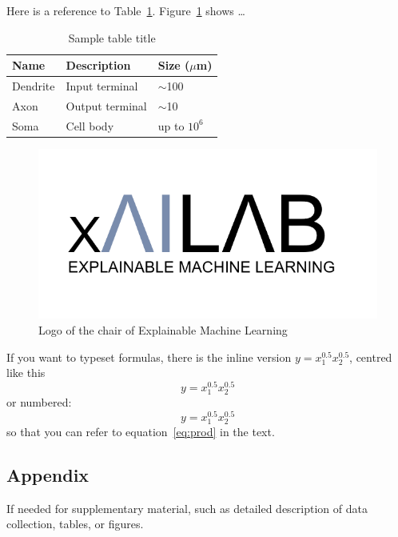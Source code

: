 \documentclass{xai-thesis}
\begin{document}
Here is a reference to Table~\ref{t1:sample}. Figure~\ref{fig:xai_logo} shows \ldots


\begin{table}[ht]
	\caption{Sample table title}
	\centering
	\begin{tabular}{lll}
		\hline
		Name     & Description     & Size ($\mu$m) \\
		\hline
		Dendrite & Input terminal  & $\sim$100     \\
		Axon     & Output terminal & $\sim$10      \\
		Soma     & Cell body       & up to $10^6$  \\
		\hline
	\end{tabular}
   \label{t1:sample}
\end{table}


\begin{figure}[ht]
  \centering
   \includegraphics[width=.5\textwidth]{xaiLogo.png}
  \caption{Logo of the chair of Explainable Machine Learning}   
  \label{fig:xai_logo}
\end{figure}  

If you want to typeset formulas, there is the inline version $ y = x_1^{0.5} x_2^{0.5}$, centred like this
\[
y = x_1^{0.5} x_2^{0.5}
\]
or numbered:
\begin{equation}\label{eq:prod}
y = x_1^{0.5} x_2^{0.5}	
\end{equation}
so that you can refer to equation~\ref{eq:prod} in the text.


\clearpage
\begin{appendix}
	\section{Appendix}
	If needed for supplementary material, such as detailed description of data collection, tables, or figures.
	
\end{appendix}

\clearpage
\renewcommand\refname{Bibliography}



\clearpage
\makeThesisDeclaration
\end{document}
